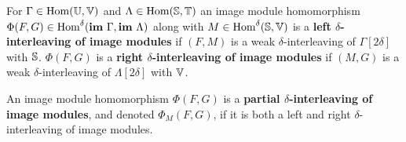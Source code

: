 \begin{definition}
  For $\Gamma\in\Hom(\U,\V)$ and $\Lambda\in\Hom(\S,\T)$ an image module homomorphism $\Phi(F, G)\in\Hom^\delta(\im~\Gamma,\im~\Lambda)$ along with $M\in\Hom^\delta(\S,\V)$ is a \textbf{left $\delta$-interleaving of image modules} if $(F, M)$ is a weak $\delta$-interleaving of $\Gamma[2\delta]$ with $\S$.
  $\Phi(F, G)$ is a \textbf{right $\delta$-interleaving of image modules} if $(M, G)$ is a weak $\delta$-interleaving of $\Lambda[2\delta]$ with $\V$.

  An image module homomorphism $\Phi(F, G)$ is a \textbf{partial $\delta$-interleaving of image modules}, and denoted $\Phi_M(F, G)$, if it is both a left and right $\delta$-interleaving of image modules.
\end{definition}

%
%

